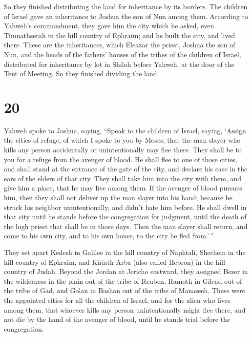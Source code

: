  So they finished distributing the land for inheritance
by its borders. The children of Israel gave an inheritance to Joshua the
son of Nun among them.  According to Yahweh's
commandment, they gave him the city which he asked, even Timnathserah in
the hill country of Ephraim; and he built the city, and lived there.
 These are the inheritances, which Eleazar the priest,
Joshua the son of Nun, and the heads of the fathers' houses of the
tribes of the children of Israel, distributed for inheritance by lot in
Shiloh before Yahweh, at the door of the Tent of Meeting. So they
finished dividing the land.

\hypertarget{section-19}{%
\section{20}\label{section-19}}

 Yahweh spoke to Joshua, saying,  ``Speak to
the children of Israel, saying, `Assign the cities of refuge, of which I
spoke to you by Moses,  that the man slayer who kills any
person accidentally or unintentionally may flee there. They shall be to
you for a refuge from the avenger of blood.  He shall flee
to one of those cities, and shall stand at the entrance of the gate of
the city, and declare his case in the ears of the elders of that city.
They shall take him into the city with them, and give him a place, that
he may live among them.  If the avenger of blood pursues
him, then they shall not deliver up the man slayer into his hand;
because he struck his neighbor unintentionally, and didn't hate him
before.  He shall dwell in that city until he stands
before the congregation for judgment, until the death of the high priest
that shall be in those days. Then the man slayer shall return, and come
to his own city, and to his own house, to the city he fled from.'\,''

 They set apart Kedesh in Galilee in the hill country of
Naphtali, Shechem in the hill country of Ephraim, and Kiriath Arba (also
called Hebron) in the hill country of Judah.  Beyond the
Jordan at Jericho eastward, they assigned Bezer in the wilderness in the
plain out of the tribe of Reuben, Ramoth in Gilead out of the tribe of
Gad, and Golan in Bashan out of the tribe of Manasseh. 
These were the appointed cities for all the children of Israel, and for
the alien who lives among them, that whoever kills any person
unintentionally might flee there, and not die by the hand of the avenger
of blood, until he stands trial before the congregation.

